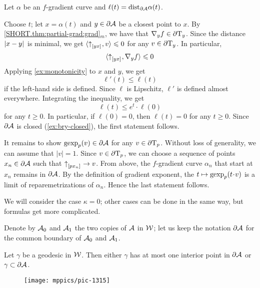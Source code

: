Let $\alpha$ be an $f$-gradient curve and $\ell(t)=\mathrm{dist}_{\partial \mathcal{A}}\alpha(t)$.

Choose $t$;
let $x=\alpha(t)$ and $y\in \partial\mathcal{A}$ be a closest point to $x$.
By \ref{SHORT.thm:partial-grad:grad}$_m$, we have that $\nabla_y f\in\partial \mathrm{T}_y$.
Since the distance $|{x}-{y}|_{}^{{}}$ is minimal, 
we get $\langle {\uparrow}_{[{y}{x}]_{{}}},v\rangle\leqslant 0$ for any $v\in \partial \mathrm{T}_y$.
In particular,
\[\langle {\uparrow}_{[{y}{x}]_{{}}},\nabla_y f\rangle\leqslant 0\]
Applying \ref{ex:monotonicity} to $x$ and $y$,
we get
\[\ell'(t)\le \ell(t)\]
if the left-hand side is defined.
Since $\ell$ is Lipschitz, $\ell'$ is defined almost everywhere.
Integrating the inequality, we get 
\[\ell(t)\le e^t\cdot\ell(0)\]
for any $t\ge 0$.
In particular, if $\ell(0)=0$, then $\ell(t)=0$ for any $t\ge 0$.
Since $\partial\mathcal{A}$ is closed (\ref{ex:bry-closed}), the first statement follows.

It remains to show $\operatorname{\rm gexp}\nolimits_p(v)\in \partial \mathcal{A}$ for any $v\in\partial\mathrm{T}_p$.
Without loss of generality, we can assume that $|v|=1$.
Since $v\in\partial\mathrm{T}_p$, we can choose a sequence of points $x_n\in \partial \mathcal{A}$ such that ${\uparrow}_{[{p}{x_n}]_{{}}}\to v$.
From above, the $f$-gradient curve $\alpha_n$ that start at $x_n$ remains in $\partial\mathcal{A}$.
By the definition of gradient exponent, the $t\mapsto \gexp_p(t\cdot v)$ is a limit of reparemetrizations of $\alpha_n$.
Hence the last statement follows.

We will consider the case $\kappa=0$;
other cases can be done in the same way, but formulas get more complicated.

Denote by $\mathcal{A}_0$ and $\mathcal{A}_1$ the two copies of $\mathcal{A}$ in $\mathcal{W}$;
let us keep the notation $\partial \mathcal{A}$ for the common boundary of $\mathcal{A}_0$ and $\mathcal{A}_1$.

\begin{clm}{}
Let $\gamma$ be a geodesic in $\mathcal{W}$.
Then either $\gamma$ has at most one interior point in $\partial \mathcal{A}$ or
$\gamma\subset \partial \mathcal{A}$.
\end{clm}

\begin{wrapfigure}{r}{45mm}
\vskip-2mm
\centering
\texttt{[image: mppics/pic-1315]}
\end{wrapfigure}


